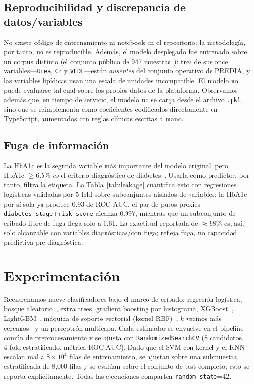 \documentclass[conference]{IEEEtran}
\begin{document}
\subsection{Reproducibilidad y discrepancia de datos/variables}
No existe código de entrenamiento ni notebook en el repositorio; la metodología,
por tanto, no es reproducible. Además, el modelo desplegado fue entrenado sobre
un corpus distinto (el conjunto público de 947 muestras~\cite{rashid2020diabetes}):
tres de sus once variables---\texttt{Urea}, \texttt{Cr} y \texttt{VLDL}---están
\emph{ausentes} del conjunto operativo de PREDIA, y las variables lipídicas usan
una escala de unidades incompatible. El modelo no puede evaluarse tal cual sobre
los propios datos de la plataforma. Observamos además que, en tiempo de
servicio, el modelo no se carga desde el archivo \texttt{.pkl}, sino que se
reimplementa como coeficientes codificados directamente en TypeScript,
aumentados con reglas clínicas escritas a mano.

\subsection{Fuga de información}
La HbA1c es la segunda variable más importante del modelo original, pero HbA1c
$\geq 6.5\%$ \emph{es} el criterio diagnóstico de diabetes~\cite{ada2021classification}.
Usarla como predictor, por tanto, filtra la etiqueta. La Tabla~\ref{tab:leakage}
cuantifica esto con regresiones logísticas validadas por 5-fold sobre
subconjuntos aislados de variables: la HbA1c por sí sola ya produce 0.93 de
ROC-AUC, el par de puros proxies \texttt{diabetes\_stage}+\texttt{risk\_score}
alcanza 0.997, mientras que un subconjunto de cribado libre de fuga llega solo a
0.61. La exactitud reportada de $\approx$98\% es, así, solo alcanzable con
variables diagnósticas/con fuga; refleja fuga, no capacidad predictiva
pre-diagnóstica.



\section{Experimentación}
Reentrenamos nueve clasificadores bajo el marco de cribado: regresión logística,
bosque aleatorio~\cite{breiman2001random}, extra trees, gradient boosting por
histograma, XGBoost~\cite{chen2016xgboost}, LightGBM~\cite{ke2017lightgbm},
máquina de soporte vectorial (kernel RBF)~\cite{cortes1995svm}, $k$ vecinos más
cercanos~\cite{cover1967knn} y un perceptrón multicapa. Cada estimador se
envuelve en el pipeline común de preprocesamiento y se ajusta con
\texttt{RandomizedSearchCV} (8 candidatos, 4-fold estratificado, métrica
ROC-AUC). Dado que el SVM con kernel y el KNN escalan mal a $8\times10^4$ filas
de entrenamiento, se ajustan sobre una submuestra estratificada de 8{,}000 filas
y se evalúan sobre el conjunto de test completo; esto se reporta explícitamente.
Todas las ejecuciones comparten \texttt{random\_state}=42.
\end{document}

